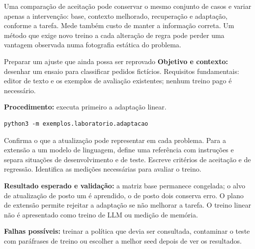 Uma comparação de aceitação pode conservar o mesmo conjunto de casos e variar apenas a intervenção: base, contexto melhorado, recuperação e adaptação, conforme a tarefa. Mede também custo de manter a informação correta. Um método que exige novo treino a cada alteração de regra pode perder uma vantagem observada numa fotografia estática do problema.

\begin{promptlabbox}{Preparar um ajuste que ainda possa ser reprovado}
\textbf{Objetivo e contexto:} desenhar um ensaio para classificar pedidos fictícios. Requisitos fundamentais: editor de texto e os exemplos de avaliação existentes; nenhum treino pago é necessário.

\textbf{Procedimento:} executa primeiro a adaptação linear.

\begin{lstlisting}
python3 -m exemplos.laboratorio.adaptacao
\end{lstlisting}

Confirma o que a atualização pode representar em cada problema. Para a extensão a um modelo de linguagem, define uma referência com instruções e separa situações de desenvolvimento e de teste. Escreve critérios de aceitação e de regressão. Identifica as medições necessárias para avaliar o treino.

\textbf{Resultado esperado e validação:} a matriz base permanece congelada; o alvo de atualização de posto um é aprendido, o de posto dois conserva erro. O plano de extensão permite rejeitar a adaptação se não melhorar a tarefa. O treino linear não é apresentado como treino de LLM ou medição de memória.

\textbf{Falhas possíveis:} treinar a política que devia ser consultada, contaminar o teste com paráfrases de treino ou escolher a melhor seed depois de ver os resultados.
\end{promptlabbox}
